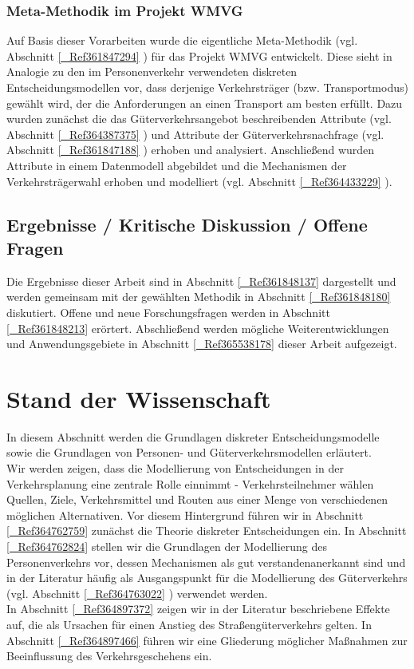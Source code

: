 \subsubsection{Meta-Methodik im Projekt WMVG}
\label{_Toc366766074}
\label{_Toc366775268}
Auf Basis dieser Vorarbeiten wurde die eigentliche Meta-Methodik (vgl. Abschnitt \autoref{_Ref361847294} ) für das Projekt WMVG entwickelt. Diese sieht in Analogie zu den im Personenverkehr verwendeten diskreten Entscheidungsmodellen vor, dass derjenige Verkehrsträger (bzw. Transportmodus) gewählt wird, der die Anforderungen an einen Transport am besten erfüllt. Dazu wurden zunächst die das Güterverkehrsangebot beschreibenden Attribute (vgl. Abschnitt \autoref{_Ref364387375} ) und Attribute der Güterverkehrsnachfrage (vgl. Abschnitt \autoref{_Ref361847188} ) erhoben und analysiert. Anschließend wurden Attribute in einem Datenmodell abgebildet und die Mechanismen der Verkehrsträgerwahl erhoben und modelliert (vgl. Abschnitt \autoref{_Ref364433229} ).
% 
\subsection{Ergebnisse / Kritische Diskussion / Offene Fragen}
\label{_Toc364945118}
\label{_Toc365801589}
\label{_Toc366766075}
\label{_Toc366775269}
Die Ergebnisse dieser Arbeit sind in Abschnitt \autoref{_Ref361848137}  dargestellt und werden gemeinsam mit der gewählten Methodik in Abschnitt \autoref{_Ref361848180}  diskutiert. Offene und neue Forschungsfragen werden in Abschnitt \autoref{_Ref361848213}  erörtert. Abschließend werden mögliche Weiterentwicklungen und Anwendungsgebiete in Abschnitt \autoref{_Ref365538178}  dieser Arbeit aufgezeigt.
% 
\section{Stand der Wissenschaft }
\label{_Toc365801590}
\label{_Toc366766076}
\label{_Toc366775270}
In diesem Abschnitt werden die Grundlagen diskreter Entscheidungsmodelle sowie die Grundlagen von Personen- und Güterverkehrsmodellen erläutert.~\\
Wir werden zeigen, dass die Modellierung von Entscheidungen in der Verkehrsplanung eine zentrale Rolle einnimmt - Verkehrsteilnehmer wählen Quellen, Ziele, Verkehrsmittel und Routen aus einer Menge von verschiedenen möglichen Alternativen. Vor diesem Hintergrund führen wir in Abschnitt \autoref{_Ref364762759}  zunächst die Theorie diskreter Entscheidungen ein. In Abschnitt \autoref{_Ref364762824}  stellen wir die Grundlagen der Modellierung des Personenverkehrs vor, dessen Mechanismen als \glqq gut verstanden\grqq  anerkannt sind und in der Literatur häufig als Ausgangspunkt für die Modellierung des Güterverkehrs (vgl. Abschnitt \autoref{_Ref364763022} ) verwendet werden.~\\
In Abschnitt \autoref{_Ref364897372}  zeigen wir in der Literatur beschriebene Effekte auf, die als Ursachen für einen Anstieg des Straßengüterverkehrs gelten. In Abschnitt \autoref{_Ref364897466}  führen wir eine Gliederung möglicher Maßnahmen zur Beeinflussung des Verkehrsgeschehens ein.
% 
